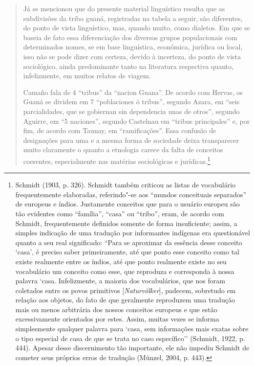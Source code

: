 \begin{quote}
Já se mencionou que do presente material linguístico resulta que as
subdivisões da tribo guaná, registradas na tabela a seguir, são
diferentes, do ponto de vista linguístico, mas, quando muito, como
dialetos. Em que se baseia de fato essa diferenciação dos diversos
grupos populacionais com determinados nomes, se em base linguística,
econômica, jurídica ou local, isso não se pode dizer com certeza, devido
à incerteza, do ponto de vista sociológico, ainda predominante tanto na
literatura respectiva quanto, infelizmente, em muitos relatos de
viagem.

Camaño fala de 4 ``tribus'' da ``nacion Guana''. De acordo com Hervas,
os Guaná se dividem em 7 ``poblaciones ó tribus'', segundo Azara, em
``seis parcialidades, que se gobiernan sin dependencia unas de otros'',
segundo Aguirre, em ``5 naciones'', segundo Castelnau em ``tribus
principales'' e, por fim, de acordo com Taunay, em ``ramificações''.
Essa confusão de designações para uma e a mesma forma de sociedade
deixa transparecer muito claramente o quanto a etnologia carece da falta
de conceitos coerentes, especialmente nas matérias sociológicas e
jurídicas.\footnote{Schmidt (1903, p. 326). Schmidt também criticou as
  listas de vocabulário frequentemente elaboradas, referindo"-se aos
  ``mundos conceituais separados'' de europeus e índios. Justamente
  conceitos que para o usuário europeu são tão evidentes como
  ``família'', ``casa'' ou ``tribo'', eram, de acordo com Schmidt,
  frequentemente definidos somente de forma insuficiente; assim, a
  simples indicação de uma tradução por informantes indígenas era
  questionável quanto a seu real significado: ``Para se aproximar da
  essência desse conceito `casa', é preciso saber primeiramente, até que
  ponto esse conceito como tal existe realmente entre os índios, até que
  ponto realmente existe no seu vocabulário um conceito como esse, que
  reproduza e corresponda à nossa palavra `casa. Infelizmente, a
  maioria dos vocabulários, que nos foram coletados entre os povos
  primitivos {[}\emph{Naturvölker}{]}, padecem, sobretudo em relação aos
  objetos, do fato de que geralmente reproduzem uma tradução mais ou
  menos arbitrária dos nossos conceitos europeus e que estão
  excessivamente orientados por estes. Assim, muitas vezes se informa
  simplesmente qualquer palavra para `casa, sem informações mais exatas
  sobre o tipo especial de casa de que se trata no caso específico''
  (Schmidt, 1922, p. 444). Apesar desse discernimento tão importante,
  ele não impediu Schmidt de cometer seus próprios erros de tradução
  (Münzel, 2004, p. 443).}
\end{quote}

